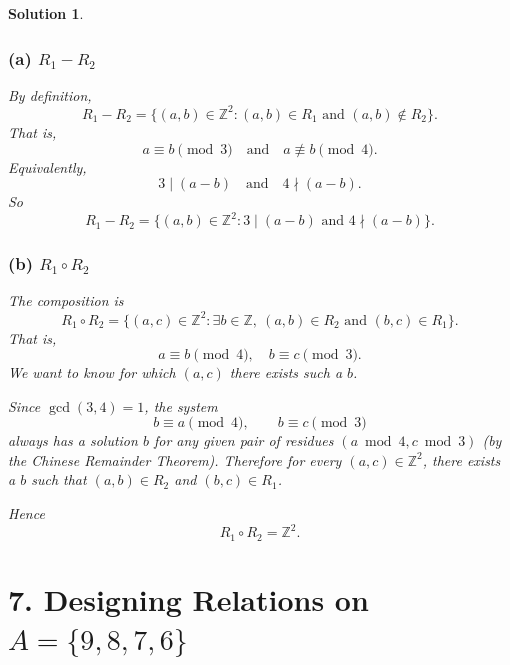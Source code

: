 \documentclass[11pt]{article}
\newtheorem*{solution}{Solution}
\begin{document}
\begin{solution}

\subsubsection*{(a) $R_1 - R_2$}
By definition,
\[
R_1 - R_2 = \{(a,b)\in\mathbb{Z}^2 : (a,b)\in R_1 \text{ and } (a,b)\notin R_2\}.
\]
That is,
\[
a\equiv b\pmod{3} \quad\text{and}\quad a\not\equiv b\pmod{4}.
\]
Equivalently,
\[
3 \mid (a-b) \quad\text{and}\quad 4 \nmid (a-b).
\]
So
\[
R_1 - R_2 = \{(a,b)\in\mathbb{Z}^2 : 3\mid(a-b) \text{ and } 4\nmid(a-b)\}.
\]

\subsubsection*{(b) $R_1 \circ R_2$}
The composition is
\[
R_1\circ R_2 = \{(a,c)\in\mathbb{Z}^2 : \exists b\in\mathbb{Z},\ (a,b)\in R_2 \text{ and } (b,c)\in R_1\}.
\]
That is,
\[
a\equiv b\pmod{4},\quad b\equiv c\pmod{3}.
\]
We want to know for which $(a,c)$ there exists such a $b$.

Since $\gcd(3,4)=1$, the system
\[
b \equiv a \pmod{4},\qquad b\equiv c \pmod{3}
\]
always has a solution $b$ for any given pair of residues $(a \bmod 4, c \bmod 3)$ (by the Chinese Remainder Theorem). Therefore for \emph{every} $(a,c)\in\mathbb{Z}^2$, there exists a $b$ such that $(a,b)\in R_2$ and $(b,c)\in R_1$.

Hence
\[
R_1\circ R_2 = \mathbb{Z}^2.
\]
\end{solution}

\section*{7. Designing Relations on $A = \{9,8,7,6\}$}
\end{document}
